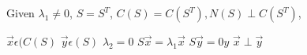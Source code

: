 Given $\lambda_1 \neq 0$, $S=S^T$, $C(S)=C(S^T), N(S)\perp C(S^T)$,
	    \begin{center}
	        $\vec{x}\epsilon(C(S)$
	        \newline
	        $\vec{y}\epsilon(S)$
	        \newline
	        $\lambda_2=0$        
	        \newline
	        $S\vec{x}=\lambda_1\vec{x}$ 
	        \newline
	        $S\vec{y}=0y$          
	        \newline
	        $\vec{x}\perp\vec{y}$
	        \newline
	        
	    \end{center}
